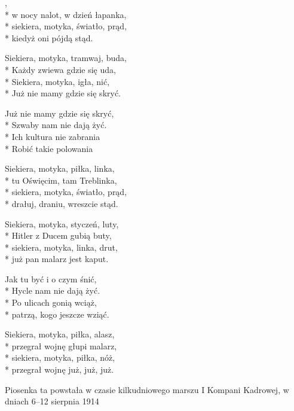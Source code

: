 \begin{lyrics}[longestline={Siekiera, motyka, bimber, szklanka,}]

,\\*
w nocy nalot, w dzień łapanka,\\*
siekiera, motyka, światło, prąd,\\*
kiedyż oni pójdą stąd.

Siekiera, motyka, tramwaj, buda,\\*
Każdy zwiewa gdzie się uda,\\*
Siekiera, motyka, igła, nić,\\*
Już nie mamy gdzie się skryć.

\vin Już nie mamy gdzie się skryć,\\*
\vin Szwaby nam nie dają żyć.\\*
\vin Ich kultura nie zabrania\\*
\vin Robić takie polowania

Siekiera, motyka, piłka, linka,\\*
tu Oświęcim, tam Treblinka,\\*
siekiera, motyka, światło, prąd,\\*
drałuj, draniu, wreszcie stąd.

Siekiera, motyka, styczeń, luty,\\*
Hitler z Ducem gubią buty,\\*
siekiera, motyka, linka, drut,\\*
już pan malarz jest kaput.

\vin Jak tu być i o czym śnić,\\*
\vin Hycle nam nie dają żyć.\\*
\vin Po ulicach gonią wciąż,\\*
\vin patrzą, kogo jeszcze wziąć.

Siekiera, motyka, piłka, alasz,\\*
przegrał wojnę głupi malarz,\\*
siekiera, motyka, piłka, nóż,\\*
przegrał wojnę już, już, już.
\end{lyrics}



\begin{info}Piosenka ta powstała w czasie kilkudniowego marszu I Kompani Kadrowej, w dniach 6–12 sierpnia 1914\end{info}

